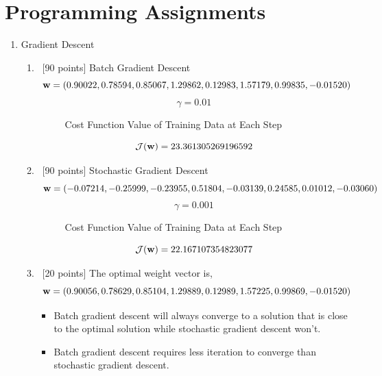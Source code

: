 \documentclass[12pt, fullpage,letterpaper]{article}
\newcommand{\bw}{{\bf w}}
\begin{document}
\section{Programming Assignments}
\begin{enumerate}
\item Gradient Descent
\begin{enumerate}
\item~[90 points] Batch Gradient Descent\\
$$\bw=(0.90022, 0.78594, 0.85067, 1.29862, 0.12983, 1.57179, 0.99835, -0.01520)$$
$$\gamma=0.01$$
\begin{figure}[H]
\caption{Cost Function Value of Training Data at Each Step}
\label{fig:name}
\end{figure}
$$\mathcal{J}(\bw)=23.361305269196592$$
\item~[90 points] Stochastic Gradient Descent
$$\bw=(-0.07214, -0.25999, -0.23955, 0.51804, -0.03139, 0.24585, 0.01012, -0.03060)$$
$$\gamma=0.001$$
\begin{figure}[H]
\caption{Cost Function Value of Training Data at Each Step}
\label{fig:name}
\end{figure}
$$\mathcal{J}(\bw)=22.167107354823077$$
\item~[20 points] The optimal weight vector is,
$$\bw=(0.90056, 0.78629, 0.85104, 1.29889, 0.12989, 1.57225, 0.99869, -0.01520)$$
\begin{itemize}
\item Batch gradient descent will always converge to a solution that is close to the optimal solution while stochastic gradient descent won't.
\item Batch gradient descent requires less iteration to converge than stochastic gradient descent.

\end{itemize}
\end{enumerate}
\end{enumerate}
\end{document}
